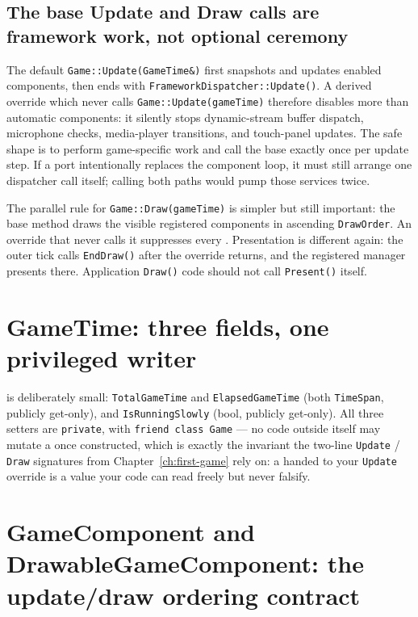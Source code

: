 \subsection{The base Update and Draw calls are framework work, not optional ceremony}

The default \texttt{Game::Update(GameTime\&)} first snapshots and updates enabled components,
then ends with \texttt{FrameworkDispatcher::Update()}. A derived override which never calls
\texttt{Game::Update(gameTime)} therefore disables more than automatic components: it silently
stops dynamic-stream buffer dispatch, microphone checks, media-player transitions, and touch-panel
updates. The safe shape is to perform game-specific work and call the base exactly once per update
step. If a port intentionally replaces the component loop, it must still arrange one dispatcher
call itself; calling both paths would pump those services twice.

The parallel rule for \texttt{Game::Draw(gameTime)} is simpler but still important: the base
method draws the visible registered components in ascending \texttt{DrawOrder}. An override that
never calls it suppresses every . Presentation is different again:
the outer tick calls \texttt{EndDraw()} after the override returns, and the registered manager
presents there. Application \texttt{Draw()} code should not call \texttt{Present()} itself.

\section{GameTime: three fields, one privileged writer}

 is deliberately small: \texttt{TotalGameTime} and
\texttt{ElapsedGameTime} (both \texttt{TimeSpan}, publicly get-only), and
\texttt{IsRunningSlowly} (bool, publicly get-only). All three setters are \texttt{private},
with \texttt{friend class Game} --- no code outside  itself may mutate a
 once constructed, which is exactly the invariant the two-line
\texttt{Update} / \texttt{Draw} signatures from Chapter~\ref{ch:first-game} rely on: a
 handed to your \texttt{Update} override is a value your code can read
freely but never falsify.

\section[GameComponent and DrawableGameComponent: the ordering contract]{GameComponent and DrawableGameComponent: the update/draw ordering contract}

